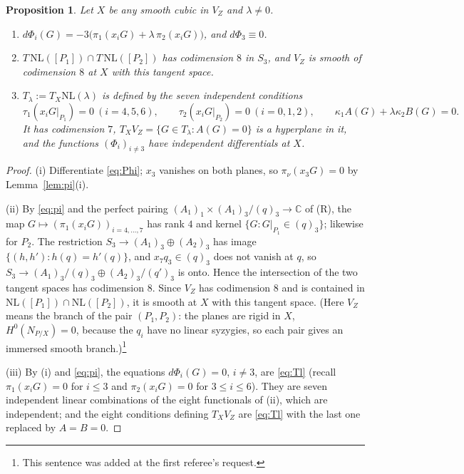 \documentclass[10pt]{article}
\numberwithin{equation}{section}
\newtheorem{proposition}[theorem]{Proposition}
\theoremstyle{remark}
\newcommand{\CC}{\mathbb{C}}
\newcommand{\NL}{\mathrm{NL}}
\newcommand{\VZ}{V_Z}
\begin{document}
\begin{proposition}\label{prop:tangent}
Let $X$ be any smooth cubic in $\VZ$ and $\lambda\ne 0$.
\begin{enumerate}[label=\textup{(\roman*)}]
\item $d\Phi_i(G)=-3\bigl(\pi_1(x_iG)+\lambda\,\pi_2(x_iG)\bigr)$, and $d\Phi_3\equiv0$.
\item $T\,\NL([P_1])\cap T\,\NL([P_2])$ has codimension $8$ in $S_3$, and $\VZ$ is smooth of codimension $8$ at
$X$ with this tangent space.
\item $T_\lambda:=T_X\NL(\lambda)$ is defined by the seven independent conditions
\begin{equation}\label{eq:Tl}
\tau_1(x_iG|_{P_1})=0\ (i=4,5,6),\qquad \tau_2(x_iG|_{P_2})=0\ (i=0,1,2),\qquad
\kappa_1A(G)+\lambda\kappa_2B(G)=0 .
\end{equation}
It has codimension $7$, $T_X\VZ=\{G\in T_\lambda:A(G)=0\}$ is a hyperplane in it, and the functions
$(\Phi_i)_{i\neq3}$ have independent differentials at $X$.
\end{enumerate}
\end{proposition}
\begin{proof}
(i) Differentiate \eqref{eq:Phi}; $x_3$ vanishes on both planes, so $\pi_\nu(x_3G)=0$ by Lemma~\ref{lem:pi}(i).

(ii) By \eqref{eq:pi} and the perfect pairing $(A_1)_1\times(A_1)_3/(q)_3\to\CC$ of (R), the map
$G\mapsto(\pi_1(x_iG))_{i=4,\dots,7}$ has rank $4$ and kernel $\{G:G|_{P_1}\in(q)_3\}$; likewise for $P_2$. The
restriction $S_3\to(A_1)_3\oplus(A_2)_3$ has image $\{(h,h'):h(q)=h'(q)\}$, and $x_7q_3\in(q)_3$ does not vanish
at $q$, so $S_3\to(A_1)_3/(q)_3\oplus(A_2)_3/(q')_3$ is onto. Hence the intersection of the two tangent spaces
has codimension $8$. Since $\VZ$ has codimension $8$ and is contained in $\NL([P_1])\cap\NL([P_2])$, it is smooth
at $X$ with this tangent space. (Here $\VZ$ means the branch of the pair $(P_1,P_2)$: the planes are rigid in
$X$, $H^0(N_{P/X})=0$, because the $q_i$ have no linear syzygies, so each pair gives an immersed smooth
branch.)\footnote{This sentence was added at the first referee's request.}

(iii) By (i) and \eqref{eq:pi}, the equations $d\Phi_i(G)=0$, $i\ne3$, are \eqref{eq:Tl} (recall
$\pi_1(x_iG)=0$ for $i\le3$ and $\pi_2(x_iG)=0$ for $3\le i\le6$). They are seven independent linear
combinations of the eight functionals of (ii), which are independent; and the eight conditions defining
$T_X\VZ$ are \eqref{eq:Tl} with the last one replaced by $A=B=0$.
\end{proof}
\end{document}
